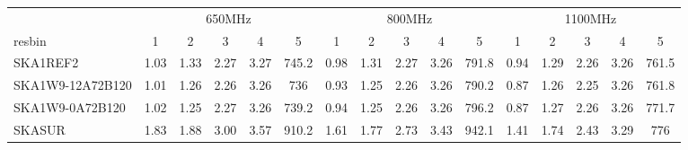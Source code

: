 \begin{table}[!htp]
{{\begin{tabular}{|lccccc||ccccc||ccccc|}
 \tabularnewline \cline{2-16} \multicolumn{1}{c}{ } & \multicolumn{5}{|c}{650MHz}  & \multicolumn{5}{c}{800MHz}  & \multicolumn{5}{c|}{1100MHz} \tabularnewline \cline{1-16} 
 resbin  &1 & 2 & 3 & 4 & 5 & 1 & 2 & 3 & 4 & 5 & 1 & 2 & 3 & 4 & 5 \tabularnewline \hline
SKA1REF2 & 1.03 \cellcolor{blue!19.09} & 1.33 \cellcolor{red!22.77} & 2.27 \cellcolor{green!18.56} & 3.27 \cellcolor{orange!19.09} & 745.2 \cellcolor{purple!20.22} & 0.98 \cellcolor{blue!21.10} & 1.31 \cellcolor{red!22.78} & 2.27 \cellcolor{green!18.73} & 3.26 \cellcolor{orange!19.19} & 791.8 \cellcolor{purple!18.46} & 0.94 \cellcolor{blue!22.90} & 1.29 \cellcolor{red!20.03} & 2.26 \cellcolor{green!19.77} & 3.26 \cellcolor{orange!26.60} & 761.5 \cellcolor{purple!18.00}\\ \hline 
SKA1W9-12A72B120 & 1.01 \cellcolor{blue!18.00} & 1.26 \cellcolor{red!18.15} & 2.26 \cellcolor{green!18.00} & 3.26 \cellcolor{orange!18.00} & 736 \cellcolor{purple!18.00} & 0.93 \cellcolor{blue!18.00} & 1.25 \cellcolor{red!18.02} & 2.26 \cellcolor{green!18.00} & 3.26 \cellcolor{orange!18.00} & 790.2 \cellcolor{purple!18.00} & 0.87 \cellcolor{blue!18.07} & 1.26 \cellcolor{red!18.00} & 2.25 \cellcolor{green!18.00} & 3.26 \cellcolor{orange!18.00} & 761.8 \cellcolor{purple!18.84}\\ \hline 
SKA1W9-0A72B120 & 1.02 \cellcolor{blue!18.28} & 1.25 \cellcolor{red!18.00} & 2.27 \cellcolor{green!18.45} & 3.26 \cellcolor{orange!18.00} & 739.2 \cellcolor{purple!18.76} & 0.94 \cellcolor{blue!18.12} & 1.25 \cellcolor{red!18.00} & 2.26 \cellcolor{green!18.60} & 3.26 \cellcolor{orange!18.50} & 796.2 \cellcolor{purple!19.66} & 0.87 \cellcolor{blue!18.00} & 1.27 \cellcolor{red!18.58} & 2.26 \cellcolor{green!19.67} & 3.26 \cellcolor{orange!24.48} & 771.7 \cellcolor{purple!47.43}\\ \hline 
SKASUR & 1.83 \cellcolor{blue!60.00} & 1.88 \cellcolor{red!60.00} & 3.00 \cellcolor{green!60.00} & 3.57 \cellcolor{orange!60.00} & 910.2 \cellcolor{purple!60.00} & 1.61 \cellcolor{blue!60.00} & 1.77 \cellcolor{red!60.00} & 2.73 \cellcolor{green!60.00} & 3.43 \cellcolor{orange!60.00} & 942.1 \cellcolor{purple!60.00} & 1.41 \cellcolor{blue!60.00} & 1.74 \cellcolor{red!60.00} & 2.43 \cellcolor{green!60.00} & 3.29 \cellcolor{orange!60.00} & 776 \cellcolor{purple!60.00}\tabularnewline \hline 
\end{tabular}}\hfil 
{}}
\end{table}
